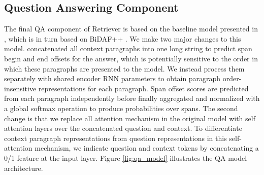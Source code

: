 \subsection{Question Answering Component} \label{sec:qa-component}

The final QA component of \golden{} Retriever is based on the baseline model presented in \cite{yang2018hotpotqa}, which is in turn based on BiDAF++ \cite{clark2017simple}.
We make two major changes to this model.
\citet{yang2018hotpotqa} concatenated all context paragraphs into one long string to predict span begin and end offsets for the answer, which is potentially sensitive to the order in which these paragraphs are presented to the model.
We instead process them separately with shared encoder RNN parameters to obtain paragraph order-insensitive representations for each paragraph.
Span offset scores are predicted from each paragraph independently before finally aggregated and normalized with a global softmax operation to produce probabilities over spans.
The second change is that we replace all attention mechanism in the original model with self attention layers over the concatenated question and context.
To differentiate context paragraph representations from question representations in this self-attention mechanism, we indicate question and context tokens by concatenating a 0/1 feature at the input layer.
Figure \ref{fig:qa_model} illustrates the QA model architecture.
